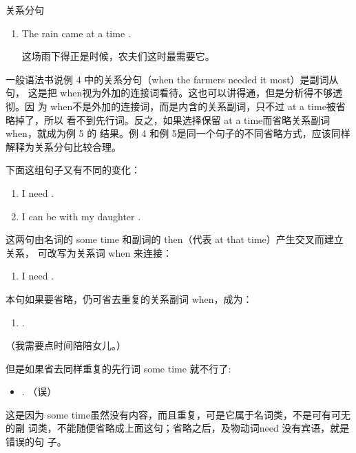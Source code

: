 关系分句
\begin{enumerate}[resume]
\item The rain came at a time .

  这场雨下得正是时候，农夫们这时最需要它。
\end{enumerate}

一般语法书说例 4 中的关系分句（when the farmers needed it most）是副词从句，
这是把 when视为外加的连接词看待。这也可以讲得通，但是分析得不够透彻。因
为 when不是外加的连接词，而是内含的关系副词，只不过 at a time被省略掉了，所以
看不到先行词。反之，如果选择保留 at a time而省略关系副词 when，就成为例 5 的
结果。例 4 和例 5是同一个句子的不同省略方式，应该同样解释为关系分句比较合理。

下面这组句子又有不同的变化：
\begin{enumerate}
\item I need .
\item I can be with my daughter .
\end{enumerate}
这两句由名词的 some time 和副词的 then（代表 at that time）产生交叉而建立关系，
可改写为关系词 when 来连接：
\begin{enumerate}[resume]
\item I need  .
\end{enumerate}
本句如果要省略，仍可省去重复的关系副词 when，成为：
\begin{enumerate}[resume]
\item {}   .
\end{enumerate}
（我需要点时间陪陪女儿。）

但是如果省去同样重复的先行词 some time 就不行了:
\begin{itemize}
\item {}  . （误）
\end{itemize}
这是因为 some time虽然没有内容，而且重复，可是它属于名词类，不是可有可无的副
词类，不能随便省略成上面这句；省略之后，及物动词need 没有宾语，就是错误的句
子。

